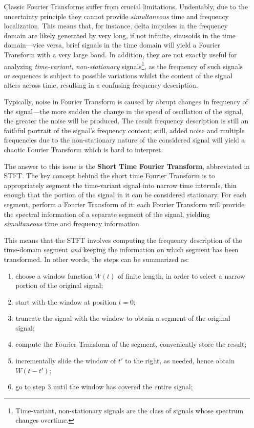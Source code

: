 \documentclass[\documentfontsize, twocolumn]{\classname}
\begin{document}
Classic Fourier Transforms suffer from crucial limitations. Undeniably, due to the uncertainty principle they cannot provide \emph{simultaneous} time and frequency localization. This means that, for instance, delta impulses in the frequency domain are likely generated by very long, if not infinite, sinusoids in the time domain---vice versa, brief signals in the time domain will yield a Fourier Transform with a very large band. In addition, they are not exactly useful for analyzing \emph{time-variant, non-stationary} signals\footnote{ Time-variant, non-stationary signals are the class of signals whose spectrum changes overtime.}, as the frequency of such signals or sequences is subject to possible variations whilst the content of the signal alters across time, resulting in a confusing frequency description.

Typically, noise in Fourier Transform is caused by abrupt changes in frequency of the signal---the more sudden the change in the speed of oscillation of the signal, the greater the noise will be produced. The result frequency description is still an faithful portrait of the signal's frequency content; still, added noise and multiple frequencies due to the non-stationary nature of the considered signal will yield a chaotic Fourier Transform which is hard to interpret.

The answer to this issue is the \textbf{Short Time Fourier Transform}, abbreviated in STFT. The key concept behind the short time Fourier Transform is to appropriately segment the time-variant signal into narrow time intervals, thin enough that the portion of the signal in it can be considered stationary. For each segment, perform a Fourier Transform of it: each Fourier Transform will provide the spectral information of a separate segment of the signal, yielding \emph{simultaneous} time and frequency information.

This means that the STFT involves computing the frequency description of the
time-domain segment \emph{and} keeping the information on which segment has
been transformed. In other words, the steps can be summarized as:
\begin{enumerate}
    \item choose a window function $W(t)$ of finite length, in order to select a
        narrow portion of the original signal;
    \item start with the window at position $t = 0$;
    \item truncate the signal with the window to obtain a segment of the
        original signal;
    \item compute the Fourier Transform of the segment, conveniently store the
        result;
    \item incrementally slide the window of $t'$ to the right, as needed, hence
        obtain $W(t - t')$;
    \item go to step $3$ until the window has covered the entire signal;
\end{enumerate}
\end{document}
